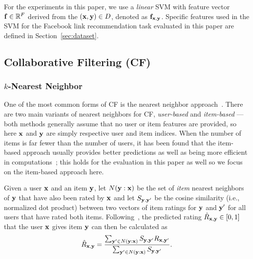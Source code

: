 For the experiments in this paper, we use a \emph{linear} SVM with
feature vector $\mathbf{f} \in \mathbb{R}^F$ derived from the $(\mathbf{x},\mathbf{y}) \in D$,
denoted as $\mathbf{f}_{\mathbf{x},\mathbf{y}}$.  Specific features used in the SVM for the
Facebook link recommendation task evaluated in this paper are defined in
Section~\ref{sec:dataset}.

\subsection{Collaborative Filtering (CF)}

\subsubsection{$k$-Nearest Neighbor}
\label{sec:nn}

One of the most common forms of CF is the nearest neighbor
approach~\cite{bellkor}. 
There are two main variants of nearest neighbors for
CF, \emph{user-based} and \emph{item-based} --- both
methods generally assume that no user or item features are provided,
so here $\mathbf{x}$ and $\mathbf{y}$ are simply respective user and item indices.
When the
number of items is far fewer than the number of users, it has been
found that the item-based approach usually provides better predictions
as well as being more efficient in computations~\cite{bellkor};
this holds for the evaluation in this paper as well so 
we focus on the item-based approach here.

Given a user $\mathbf{x}$ and an item $\mathbf{y}$, let $N(\mathbf{y}:\mathbf{x})$ be the set of
\emph{item} nearest neighbors of $\mathbf{y}$ that have also been rated by
$\mathbf{x}$ and let $S_{\mathbf{y},\mathbf{y}'}$ be the cosine similarity (i.e., normalized
dot product) between two vectors of item ratings for $\mathbf{y}$ and $\mathbf{y}'$
for all users that have rated both items.  Following~\cite{bellkor},
the predicted rating $\hat{R}_{\mathbf{x},\mathbf{y}} \in [0,1]$ that the user $\mathbf{x}$
gives item $\mathbf{y}$ can then be calculated as
\begin{equation}
\hat{R}_{\mathbf{x},\mathbf{y}} = \frac{\sum_{\mathbf{y}' \in N(\mathbf{y}:\mathbf{x})} {S_{\mathbf{y},\mathbf{y}'} R_{\mathbf{x},\mathbf{y}'}} } {\sum_{\mathbf{y}' \in N(\mathbf{y}:\mathbf{x})}{S_{\mathbf{y},\mathbf{y}'}}} .
\end{equation}

